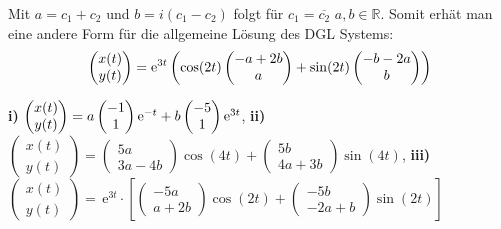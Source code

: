 {\begin{iii}
Mit \(a=c_1+c_2\) und \(b=i(c_1-c_2)\) folgt für \(c_1=\overline{c_2}\)   \(a,b\in\mathbb{R}\).
Somit erhät man eine andere Form für die allgemeine Lösung des DGL Systems:
\[\begin{pmatrix}
x(t) \\ 
y(t)
\end{pmatrix}
=\mathrm{e}^{3t}\left(\cos(2t)\begin{pmatrix} -a +2b\\a\end{pmatrix} 
+ \sin(2t)\begin{pmatrix}-b-2a\\b\end{pmatrix}\right)\]

\end{iii}
}

{
\textbf{i)} $ \begin{pmatrix} x(t)\\y(t)\end{pmatrix} = a\begin{pmatrix}-1\\1\end{pmatrix} \mathrm{e}^{-t} +
b\begin{pmatrix} -5\\1\end{pmatrix}\mathrm{e}^{3t}$, 
\textbf{ii)} $\begin{pmatrix} x(t)\\y(t)\end{pmatrix} = \begin{pmatrix}5a\\3a-4b\end{pmatrix} \cos(4t) +
\begin{pmatrix} 5b\\ 4a+3b\end{pmatrix}\sin(4t)$, 
\textbf{iii)} $\begin{pmatrix} x(t)\\y(t)\end{pmatrix}
 =\,\text{e}^{3t}\cdot \left[  
\begin{pmatrix}
-5a \\ 
a+2b
\end{pmatrix}
 \cos (2t)+ 
\begin{pmatrix}
-5b \\ 
-2a+b
\end{pmatrix}
 \sin (2t)\right]$
}

